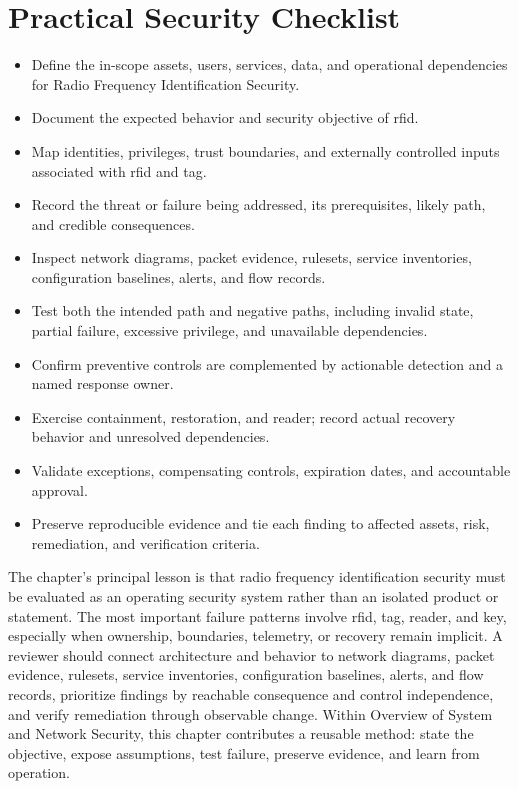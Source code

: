 \documentclass[11pt]{article}
\begin{document}
\section*{Practical Security Checklist}
\begin{itemize}[label=$\square$]
\item Define the in-scope assets, users, services, data, and operational dependencies for Radio Frequency Identification Security.
\item Document the expected behavior and security objective of rfid.
\item Map identities, privileges, trust boundaries, and externally controlled inputs associated with rfid and tag.
\item Record the threat or failure being addressed, its prerequisites, likely path, and credible consequences.
\item Inspect network diagrams, packet evidence, rulesets, service inventories, configuration baselines, alerts, and flow records.
\item Test both the intended path and negative paths, including invalid state, partial failure, excessive privilege, and unavailable dependencies.
\item Confirm preventive controls are complemented by actionable detection and a named response owner.
\item Exercise containment, restoration, and reader; record actual recovery behavior and unresolved dependencies.
\item Validate exceptions, compensating controls, expiration dates, and accountable approval.
\item Preserve reproducible evidence and tie each finding to affected assets, risk, remediation, and verification criteria.
\end{itemize}
\begin{synthesisbox}
The chapter's principal lesson is that radio frequency identification security must be evaluated as an operating security system rather than an isolated product or statement. The most important failure patterns involve rfid, tag, reader, and key, especially when ownership, boundaries, telemetry, or recovery remain implicit. A reviewer should connect architecture and behavior to network diagrams, packet evidence, rulesets, service inventories, configuration baselines, alerts, and flow records, prioritize findings by reachable consequence and control independence, and verify remediation through observable change. Within Overview of System and Network Security, this chapter contributes a reusable method: state the objective, expose assumptions, test failure, preserve evidence, and learn from operation.
\end{synthesisbox}
\end{document}
